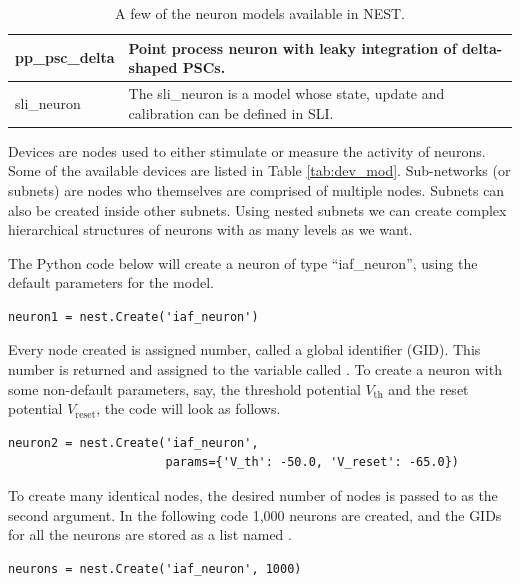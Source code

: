 \begin{table}
\begin{tabularx}{\textwidth}{| l | X |}
pp\_psc\_delta & Point process neuron with leaky integration of delta-shaped PSCs. \\ \hline
sli\_neuron & The sli\_neuron is a model whose state, update and calibration can be defined in SLI. \\ \hline
\end{tabularx} 
\caption[Neuron models in NEST]{A few of the neuron models available in NEST.}
\label{tab:neur_mod}
\end{table}

Devices are nodes used to either stimulate or measure the activity of neurons. Some of the available devices are listed in Table \ref{tab:dev_mod}. Sub-networks (or subnets) are nodes who themselves are comprised of multiple nodes. Subnets can also be created inside other subnets. Using nested subnets we can create complex hierarchical structures of neurons with as many levels as we want. 

The Python code below will create a neuron of type ``iaf\_neuron'', using the default parameters for the model. 
\begin{lstlisting}
neuron1 = nest.Create('iaf_neuron')
\end{lstlisting}
Every node created is assigned number, called a global identifier (GID). This number is returned and assigned to the variable called .
To create a neuron with some non-default parameters, say, the threshold potential $V_{\text{th}}$ and the reset potential $V_{\text{reset}}$, the code will look as follows. 
\begin{lstlisting}
neuron2 = nest.Create('iaf_neuron', 
                      params={'V_th': -50.0, 'V_reset': -65.0})
\end{lstlisting}
To create many identical nodes, the desired number of nodes is passed to  as the second argument. In the following code 1,000 neurons are created, and the GIDs for all the neurons are stored as a list named .
\begin{lstlisting}
neurons = nest.Create('iaf_neuron', 1000)
\end{lstlisting}

